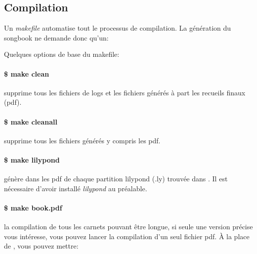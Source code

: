 \documentclass[versionenligne]{patacrep}
\begin{document}
\subsection{Compilation}

Un \emph{makefile} automatise tout le processus de compilation. La
génération du songbook ne demande donc qu'un: 

Quelques options de base du makefile:

\paragraph{\$ make clean} 
supprime tous les fichiers de logs et les fichiers générés à part les
recueils finaux (pdf).

\paragraph{\$ make cleanall}
supprime tous les fichiers générés y compris les pdf.

\paragraph{\$ make lilypond}
génère dans  les pdf de chaque partition lilypond (.ly)
trouvée dans . Il est nécessaire d'avoir installé
\emph{lilypond} au préalable.

\paragraph{\$ make book.pdf}
la compilation de tous les carnets pouvant être longue, si seule une
version précise vous intéresse, vous pouvez lancer la compilation d'un
seul fichier pdf. À la place de
, vous pouvez mettre:
\end{document}
